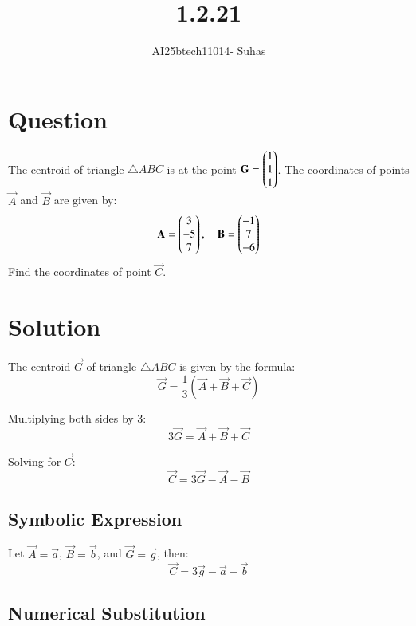 \documentclass[journal]{IEEEtran}
\begin{document}


\title{1.2.21}
\author{AI25btech11014- Suhas}

{\let\newpage\relax\maketitle}

\renewcommand{\thefigure}{\theenumi}
\renewcommand{\thetable}{\theenumi}
\setlength{\intextsep}{10pt}

\renewcommand{\thetable}{\theenumi}






\section*{Question}
\vspace{0.5cm}
The centroid of triangle $\triangle ABC$ is at the point $\vec{G} = \myvec{1\\1\\1}$.  
The coordinates of points $\vec{A}$ and $\vec{B}$ are given by:
\[
\vec{A} = \myvec{3\\-5\\7}, \quad \vec{B} = \myvec{-1\\7\\-6}
\]
Find the coordinates of point $\vec{C}$.

\section*{Solution}
\vspace{0.5cm}
The centroid $\vec{G}$ of triangle $\triangle ABC$ is given by the formula:
\[
\vec{G} = \frac{1}{3}(\vec{A} + \vec{B} + \vec{C})
\]

Multiplying both sides by 3:
\[
3\vec{G} = \vec{A} + \vec{B} + \vec{C}
\]

Solving for $\vec{C}$:
\[
\vec{C} = 3\vec{G} - \vec{A} - \vec{B}
\]

\subsection*{Symbolic Expression}

Let $\vec{A} = \vec{a}$, $\vec{B} = \vec{b}$, and $\vec{G} = \vec{g}$, then:
\[
\vec{C} = 3\vec{g} - \vec{a} - \vec{b}
\]

\subsection*{Numerical Substitution}
\end{document}
